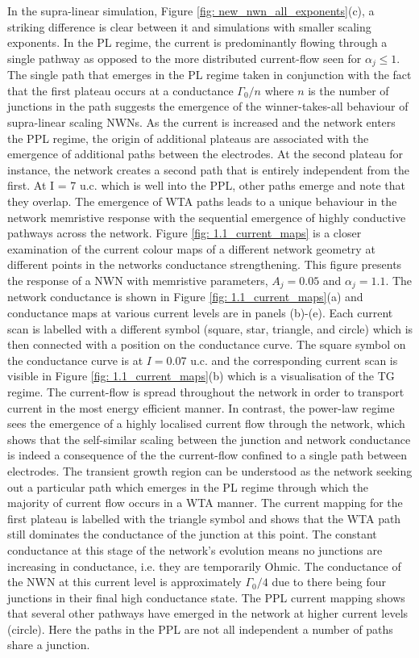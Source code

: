 In the supra-linear simulation, Figure \ref{fig: new_nwn_all_exponents}(c), a striking difference is clear between it and simulations with smaller scaling exponents. In the PL regime, the current is predominantly flowing through a single pathway as opposed to the more distributed current-flow seen for $\alpha_j \leq 1$. The single path that emerges in the PL regime taken in conjunction with the fact that the first plateau occurs at a conductance $\Gamma_0/n$ where $n$ is the number of junctions in the path suggests the emergence of the winner-takes-all behaviour of supra-linear scaling NWNs. As the current is increased and the network enters the PPL regime, the origin of additional plateaus are associated with the emergence of additional paths between the electrodes. At the second plateau for instance, the network creates a second path that is entirely independent from the first. At I = 7 u.c. which is well into the PPL, other paths emerge and note that they overlap. The emergence of WTA paths leads to a unique behaviour in the network memristive response with the sequential emergence of highly conductive pathways across the network. Figure \ref{fig: 1.1_current_maps} is a closer examination of the current colour maps of a different network geometry at different points in the networks conductance strengthening. This figure presents the response of a NWN with memristive parameters, $A_j = 0.05$ and $\alpha_j = 1.1$. The network conductance is shown in Figure \ref{fig: 1.1_current_maps}(a) and conductance maps at various current levels are in panels (b)-(e). Each current scan is labelled with a different symbol (square, star, triangle, and circle) which is then connected with a position on the conductance curve. The square symbol on the conductance curve is at $I = 0.07$ u.c. and the corresponding current scan is visible in Figure \ref{fig: 1.1_current_maps}(b) which is a visualisation of the TG regime. The current-flow is spread throughout the network in order to transport current in the most energy efficient manner. In contrast, the power-law regime sees the emergence of a highly localised current flow through the network, which shows that the self-similar scaling between the junction and network conductance is indeed a consequence of the the current-flow confined to a single path between electrodes. The transient growth region can be understood as the network seeking out a particular path which emerges in the PL regime through which the majority of current flow occurs in a WTA manner. The current mapping for the first plateau is labelled with the triangle symbol and shows that the WTA path still dominates the conductance of the junction at this point. The constant conductance at this stage of the network's evolution means no junctions are increasing in conductance, i.e. they are temporarily Ohmic. The conductance of the NWN at this current level is approximately $\Gamma_0/4$ due to there being four junctions in their final high conductance state. The PPL current mapping shows that several other pathways have emerged in the network at higher current levels (circle). Here the paths in the PPL are not all independent a number of paths share a junction.


